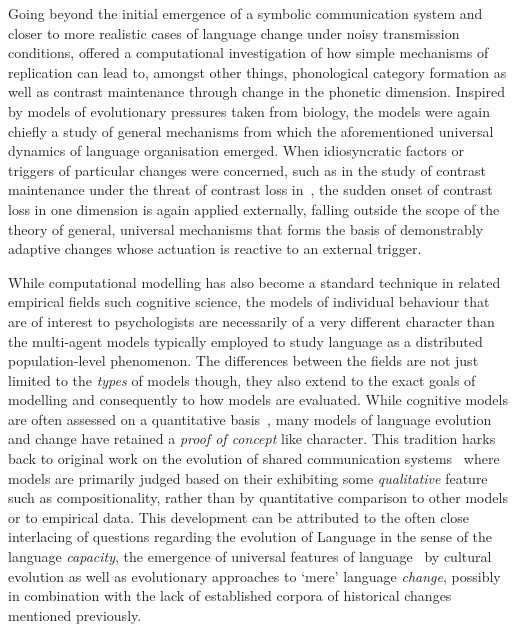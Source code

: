 Going beyond the initial emergence of a symbolic communication system and closer to more realistic cases of language change under noisy transmission conditions,
\citet{Wedel2004,Wedel2006} offered a computational investigation of how simple mechanisms of replication can lead to, amongst other things, phonological category formation as well as contrast maintenance through change in the phonetic dimension. Inspired by models of evolutionary pressures taken from biology, the models were again chiefly a study of general mechanisms from which the aforementioned universal dynamics of language organisation emerged. When idiosyncratic factors or triggers of particular changes were concerned, such as in the study of contrast maintenance under the threat of contrast loss in~\citet{Wedel2006}, the sudden onset of contrast loss in one dimension is again applied externally, falling outside the scope of the theory of general, universal mechanisms that forms the basis of demonstrably adaptive changes whose actuation is reactive to an external trigger.

While computational modelling has also become a standard technique in related empirical fields such cognitive science, the models of individual behaviour that are of interest to psychologists are necessarily of a very different character than the multi-agent models typically employed to study language as a distributed population-level phenomenon.
The differences between the fields are not just limited to the \emph{types} of models though, they also extend to the exact goals of modelling and consequently to how models are evaluated.
While cognitive models are often assessed on a quantitative basis~\citep{Busemeyer2010}, many models of language evolution and change have retained a \emph{proof of concept} like character. This tradition harks back to original work on the evolution of shared communication systems~\citep{Steels1995,Kirby2000} where models are primarily judged based on their exhibiting some \emph{qualitative} feature such as compositionality, rather than by quantitative comparison to other models or to empirical data.
This development can be attributed to the often close~\citep[and sometimes confusing][]{Haspelmath2016} interlacing of questions regarding the evolution of Language in the sense of the language \emph{capacity}, the emergence of universal features of language~\citep{Spike2017} by cultural evolution as well as evolutionary approaches to `mere' language \emph{change}, possibly in combination with the lack of established corpora of historical changes mentioned previously.

